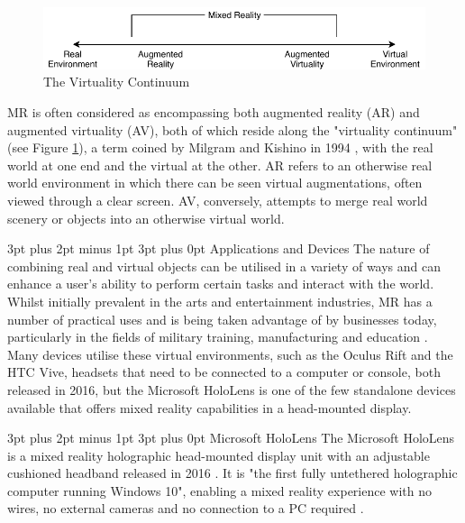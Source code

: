 \documentclass[12pt,a4paper]{article}
\makeatletter
\renewcommand\paragraph{\@startsection {paragraph}{1}{0mm} %
	                           {3pt plus 2pt minus 1pt} %
	                           {3pt plus 0pt} %
	                           {\normalfont}}
\renewcommand\subsubsection{\@startsection {subsubsection}{1}{0mm} %
	                           {3pt plus 2pt minus 1pt} %
	                           {3pt plus 0pt} %
	                           {\normalfont\bfseries}}
\makeatother
\begin{document}
\begin{figure}[!h]
	\centering
	\includegraphics[width=\textwidth]{images/virtualitycontinuum}
	\caption{The Virtuality Continuum}
	\label{fig_mr}
\end{figure}

MR is often considered as encompassing both augmented reality (AR) and augmented virtuality (AV), both of which reside along the "virtuality continuum" (see Figure \ref{fig_mr}), a term coined by Milgram and Kishino in 1994  \cite{milgram94}, with the real world at one end and the virtual at the other. AR refers to an otherwise real world environment in which there can be seen virtual augmentations, often viewed through a clear screen. AV, conversely, attempts to merge real world scenery or objects into an otherwise virtual world.

\paragraph{Applications and Devices}
The nature of combining real and virtual objects can be utilised in a variety of ways and can enhance a user's ability to perform certain tasks and interact with the world. Whilst initially prevalent in the arts and entertainment industries, MR has a number of practical uses and is being taken advantage of by businesses today, particularly in the fields of military training, manufacturing and education \cite{evans17, hughes97}. Many devices utilise these virtual environments, such as the Oculus Rift and the HTC Vive, headsets that need to be connected to a computer or console, both released in 2016, but the Microsoft HoloLens is one of the few standalone devices available that offers mixed reality capabilities in a head-mounted display.

\subsubsection{Microsoft HoloLens}
The Microsoft HoloLens is a mixed reality holographic head-mounted display unit with an adjustable cushioned headband released in 2016 \cite{microsoftcorp}. It is "the first fully untethered holographic computer running Windows 10", enabling a mixed reality experience with no wires, no external cameras and no connection to a PC required \cite{holmdahl15}.
\end{document}

